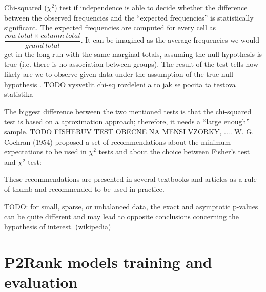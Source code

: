 Chi-squared ($\chi^{2}$) test if independence is able to decide whether the difference between the observed frequencies and the ``expected frequencies'' is statistically significant. The expected frequencies are computed for every cell as 
$\dfrac{row\: total\times column\:total}{grand\:total}$.
It can be imagined as the average frequencies we would get in the long run with the same marginal totals, assuming the null hypothesis is true (i.e. there is no association between groups). The result of the test tells how likely are we to observe given data under the assumption of the true null hypothesis \cite{bland}. TODO vysvetlit chi-sq rozdeleni a to jak se pocita ta testova statistika

The biggest difference between the two mentioned tests is that the chi-squared test is based on a aproximation approach; therefore, it needs a ``large enough'' sample. TODO FISHERUV TEST OBECNE NA MENSI VZORKY, .... W. G. Cochran (1954) \cite{cochran} proposed a set of recommendations about the minimum expectations to be used in $\chi^{2}$ tests and about the choice between Fisher's test and $\chi^{2}$ test:


These recommendations are presented in several textbooks and articles as a rule of thumb \cite{} and recommended to be used in practice.


TODO: for small, sparse, or unbalanced data, the exact and asymptotic p-values can be quite different and may lead to opposite conclusions concerning the hypothesis of interest. (wikipedia)


\section{P2Rank models training and evaluation}




